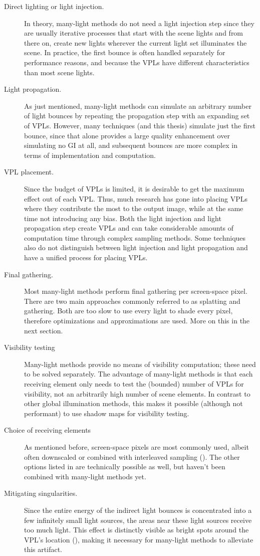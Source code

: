 \begin{description}
    \item[Direct lighting or light injection.] In theory, many-light methods do not need a light injection step since they are usually iterative processes that start with the scene lights and from there on, create new lights wherever the current light set illuminates the scene. In practice, the first bounce is often handled separately for performance reasons, and because the VPLs have different characteristics than most scene lights.
    \item[Light propagation.] As just mentioned, many-light methods can simulate an arbitrary number of light bounces by repeating the propagation step with an expanding set of VPLs. However, many techniques (and this thesis) simulate just the first bounce, since that alone provides a large quality enhancement over simulating no GI at all, and subsequent bounces are more complex in terms of implementation and computation.
    \item[VPL placement.] Since the budget of VPLs is limited, it is desirable to get the maximum effect out of each VPL. Thus, much research has gone into placing VPLs where they contribute the most to the output image, while at the same time not introducing any bias. Both the light injection and light propagation step create VPLs and can take considerable amounts of computation time through complex sampling methods. Some techniques also do not distinguish between light injection and light propagation and have a unified process for placing VPLs.
    \item[Final gathering.] Most many-light methods perform final gathering per screen-space pixel. There are two main approaches commonly referred to as splatting and gathering. Both are too slow to use every light to shade every pixel, therefore optimizations and approximations are used. More on this in the next section.
    \item[Visibility testing] Many-light methods provide no means of visibility computation; these need to be solved separately. The advantage of many-light methods is that each receiving element only needs to test the (bounded) number of VPLs for visibility, not an arbitrarily high number of scene elements. In contrast to other global illumination methods, this makes it possible (although not performant) to use shadow maps for visibility testing.
    \item[Choice of receiving elements] As mentioned before, screen-space pixels are most commonly used, albeit often downscaled or combined with interleaved sampling (). The other options listed in  are technically possible as well, but haven't been combined with many-light methods yet.
    \item[Mitigating singularities.] Since the entire energy of the indirect light bounces is concentrated into a few infinitely small light sources, the areas near these light sources receive too much light. This effect is distinctly visible as bright spots around the VPL's location (), making it necessary for many-light methods to alleviate this artifact.
\end{description}

